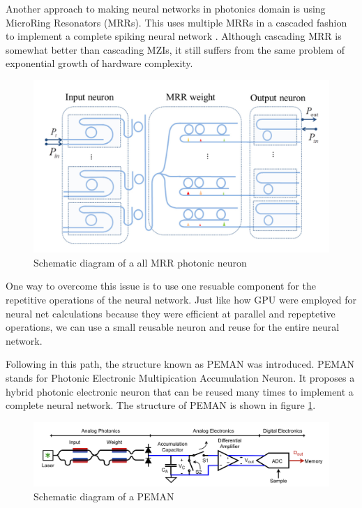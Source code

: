Another approach to making neural networks in photonics domain is using MicroRing Resonators (MRRs). This uses multiple MRRs in a cascaded fashion to implement a complete spiking neural network \cite{photonics9020120}. Although cascading MRR is somewhat better than cascading MZIs, it still suffers from the same problem of exponential growth of hardware complexity.

\begin{figure}
	\centering
	\includegraphics[scale=0.7]{images/cascadedMRR.png}
	\caption{Schematic diagram of a all MRR photonic neuron \cite{photonics9020120}}
\end{figure}

One way to overcome this issue is to use one resuable component for the repetitive operations of the neural network. Just like how GPU were employed for neural net calculations because they were efficient at parallel and repeptetive operations, we can use a small reusable neuron and reuse for the entire neural network.

Following in this path, the structure known as PEMAN \cite{demarinisCodesignedIntegratedPhotonic2022} was introduced. PEMAN stands for Photonic Electronic Multipication Accumulation Neuron. It proposes a hybrid photonic electronic neuron that can be reused many times to implement a complete neural network. The structure of PEMAN is shown in figure \ref{peman}.

\begin{figure}
	\centering
	\includegraphics[width=\textwidth]{images/peman.png}
	\caption{Schematic diagram of a PEMAN \cite{demarinisCodesignedIntegratedPhotonic2022}}
	\label{peman}
\end{figure}

